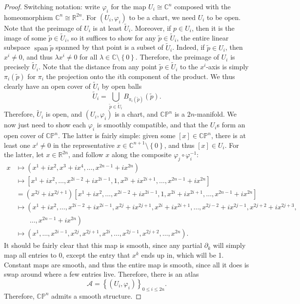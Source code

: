 \documentclass[11pt, letterpaper]{article}
\theoremstyle{theorem}
\begin{document}
\begin{proof}
	Switching notation: write $\varphi _i$ for the map $U_i \cong \mathbb{C} ^n$ composed with the homeomorphism $\mathbb{C} ^n \cong \mathbb{R} ^{2n} $. For $(U_i,\varphi _i)$ to be a chart, we need $U_i$ to be open. Note that the preimage of $U_i$ is at least $\widetilde{U} _i$. Moreover, if $p\in U_i$, then it is the image of some $\widetilde{p} \in \widetilde{U} _i$, so it suffices to show for any $\widetilde{p} \in \widetilde{U} _i$, the entire linear subspace $\operatorname{span} \widetilde{p} $ spanned by that point is a subset of $\widetilde{U} _i$. Indeed, if $\widetilde{p} \in U_i$, then $x^i\neq 0$, and thus $\lambda x^i\neq 0$ for all $\lambda \in\mathbb{C} \setminus \left\{ 0 \right\} $. Therefore, the preimage of $U_i$ is precisely $\widetilde{U} _i$. Note that the distance from any point $\widetilde{p} \in \widetilde{U} _i$ to the $x^i$-axis is simply $\pi _i(\widetilde{p} )$ for $\pi _i$ the projection onto the $i$th component of the product. We thus clearly have an open cover of $\widetilde{U} _i$ by open balls
	\[
		\widetilde{U} _i = \bigcup_{\widetilde{p} \in \widetilde{U}_i} B_{\pi _i(\widetilde{p} )} (\widetilde{p} )
	.\]
	Therefore, $\widetilde{U} _i$ is open, and $(U_i,\varphi _i)$ is a chart, and $\mathbb{C} \mathbb{P} ^n$ is a $2n$-manifold. We now just need to show each $\varphi _i$ is smoothly compatible, and that the $U_i$s form an open cover of $\mathbb{C} \mathbb{P} ^n$. The latter is fairly simple: given some $[x]\in\mathbb{C} \mathbb{P} ^n$, there is at least one $x^i\neq 0$ in the representative $x\in\mathbb{C} ^{n+1} \setminus \left\{ 0 \right\} $, and thus $[x]\in U_i$. For the latter, let $x\in\mathbb{R} ^{2n} $, and follow $x$ along the composite $\varphi _j\circ \varphi _i^{-1} $:
	\begin{align*}
		x&\mapsto \left(x^1+ix^2, x^3+ix^4, \ldots ,x^{2n-1} +ix^{2n} \right)\\
		 &\mapsto \left[ x^1+ix^2, \ldots ,x^{2i-2} +ix^{2i-1} ,1,x^{2i} +ix^{2i+1} , \ldots ,x^{2n-1} +ix^{2n}  \right] \\
		 &=\left( x^{2j} +ix^{2j+1}  \right) \left[ x^1+ix^2, \ldots ,x^{2i-2} +ix^{2i-1} ,1,x^{2i} +ix^{2i+1} , \ldots ,x^{2n-1} +ix^{2n}  \right] \\
		 &\mapsto \left( x^1+ix^2, \ldots ,x^{2i-2} +ix^{2i-1} ,x^{2j} +ix^{2j+1} ,x^{2i} +ix^{2i+1} ,\ldots ,x^{2j-2} +ix^{2j-1} ,x^{2j+2} +ix^{2j+3},\right.\\
		 &\qquad\left.\ldots ,x^{2n-1}+ix^{2n}   \right) \\
		 &\mapsto \left( x^1, \ldots ,x^{2i-1} ,x^{2j} ,x^{2j+1} ,x^{2i} ,\ldots ,x^{2j-1} ,x^{2j+2} ,\ldots ,x^{2n}  \right) 
	.\end{align*}
	It should be fairly clear that this map is smooth, since any partial $\partial _k$ will simply map all entries to 0, except the entry that $x^k$ ends up in, which will be 1. Constant maps are smooth, and thus the entire map is smooth, since all it does is swap around where a few entries live. Therefore, there is an atlas
	\[
		\mathcal{A} =\left\{ (U_i,\varphi _i) \right\}_{0\leq i\leq 2n} 
	.\]
	Therefore, $\mathbb{C} \mathbb{P} ^n$ admits a smooth structure.


\end{proof}
\end{document}
